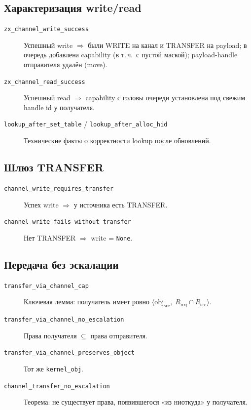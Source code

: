 \documentclass[11pt,a4paper]{article}
\begin{document}
\subsection{Характеризация write/read}

\begin{description}
  \item[\texttt{zx\_channel\_write\_success}]
        Успешный write $\Rightarrow$ были WRITE на канал и TRANSFER на
        payload; в очередь добавлена capability (в т.\,ч.\ с пустой маской);
        payload-handle отправителя удалён (move).
  \item[\texttt{zx\_channel\_read\_success}]
        Успешный read $\Rightarrow$ capability с головы очереди установлена
        под свежим handle id у получателя.
  \item[\texttt{lookup\_after\_set\_table} / \texttt{lookup\_after\_alloc\_hid}]
        Технические факты о корректности lookup после обновлений.
\end{description}

\subsection{Шлюз TRANSFER}

\begin{description}
  \item[\texttt{channel\_write\_requires\_transfer}]
        Успех write $\Rightarrow$ у источника есть TRANSFER.
  \item[\texttt{channel\_write\_fails\_without\_transfer}]
        Нет TRANSFER $\Rightarrow$ write = \texttt{None}.
\end{description}

\subsection{Передача без эскалации}

\begin{description}
  \item[\texttt{transfer\_via\_channel\_cap}]
        Ключевая лемма: получатель имеет ровно
        $\langle\mathrm{obj}_{\mathrm{src}},\;
        R_{\mathrm{req}}\cap R_{\mathrm{src}}\rangle$.
  \item[\texttt{transfer\_via\_channel\_no\_escalation}]
        Права получателя $\subseteq$ права отправителя.
  \item[\texttt{transfer\_via\_channel\_preserves\_object}]
        Тот же \texttt{kernel\_obj}.
  \item[\texttt{channel\_transfer\_no\_escalation}]
        Теорема: не существует права, появившегося «из ниоткуда» у
        получателя.
\end{description}
\end{document}
